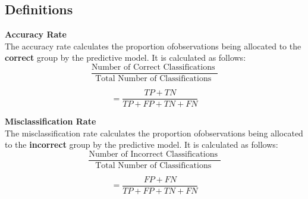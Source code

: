 \documentclass[a4]{beamer}
\begin{document}
\subsection*{Definitions}
\begin{frame}
	\textbf{Accuracy Rate}\\
	The accuracy rate calculates the proportion ofobservations being allocated to the \textbf{correct} group by the predictive model. It is calculated as follows:
	\[ \frac{
		\mbox{Number of Correct Classifications }}{\mbox{Total Number of Classifications }} \]
	
	\[ = \frac{TP + TN}{TP+FP+TN+FN}\]
	
\end{frame}
\begin{frame}
	\noindent \textbf{Misclassification Rate}\\
	The misclassification rate calculates the proportion ofobservations being allocated to the \textbf{incorrect} group by the predictive model. It is calculated as follows:
	\[ \frac{
		\mbox{Number of Incorrect Classifications }}{\mbox{Total Number of Classifications }} \]
	
	\[ = \frac{FP + FN}{TP+FP+TN+FN}\]
\end{frame}


\end{document}

